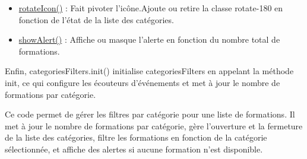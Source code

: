 \documentclass[a4paper,11pt]{article}
\begin{document}
\begin{enumerate}
\begin{enumerate}
\begin{itemize}
                                \item \underline{rotateIcon()} : Fait pivoter l'icône.Ajoute ou retire la classe rotate-180 en fonction de l'état de la liste des catégories.
                                \item \underline{showAlert()} : Affiche ou masque l'alerte en fonction du nombre total de formations.
                            \end{itemize}

                            \begin{tcolorbox}[colback=lightgray!6, colframe=black, left=5mm, right=5mm, top=2mm, bottom=2mm, boxrule=0.1mm]
                                Enfin, categoriesFilters.init() initialise categoriesFilters en appelant la méthode init, ce qui configure les écouteurs d'événements et 
                                met à jour le nombre de formations par catégorie.
                            \end{tcolorbox}
                    \end{enumerate}

                    \begin{tcolorbox}[colback=lightgray!6, colframe=black, left=5mm, right=5mm, top=2mm, bottom=2mm, boxrule=0.1mm]
                        Ce code permet de gérer les filtres par catégorie pour une liste de formations. Il met à jour le nombre de 
                        formations par catégorie, gère l'ouverture et la fermeture de la liste des catégories, filtre les formations en 
                        fonction de la catégorie sélectionnée, et affiche des alertes si aucune formation n'est disponible.
                    \end{tcolorbox}
            \end{enumerate}
\end{document}
